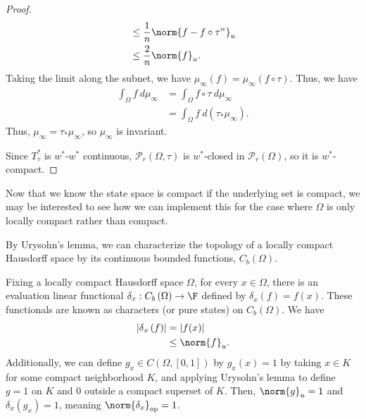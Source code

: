 \documentclass[10pt]{mypackage}
\begin{document}
\begin{proof}
\begin{align*}
                                                                                   &\leq \frac{1}{n}\norm{f - f\circ \tau^{n}}_{u}\\
                                                                                   &\leq \frac{2}{n}\norm{f}_{u}.
  \end{align*}
  Taking the limit along the subnet, we have $\mu_{\infty}\left(f\right) = \mu_{\infty}\left(f\circ \tau\right)$. Thus, we have
  \begin{align*}
    \int_{\Omega}^{} f\:d\mu_{\infty} &= \int_{\Omega}^{} f\circ\tau\:d\mu_{\infty}\\
                                      &= \int_{\Omega}^{} f\:d\left(\tau_{\ast}\mu_{\infty}\right).
  \end{align*}
  Thus, $\mu_{\infty} = \tau_{\ast}\mu_{\infty}$, so $\mu_{\infty}$ is invariant.\newline

  Since $T_{\tau}^{\ast}$ is $w^{\ast}$-$w^{\ast}$ continuous, $\mathcal{P}_{r}\left(\Omega,\tau\right)$ is $w^{\ast}$-closed in $\mathcal{P}_{r}\left(\Omega\right)$, so it is $w^{\ast}$-compact.
\end{proof}
Now that we know the state space is compact if the underlying set is compact, we may be interested to see how we can implement this for the case where $\Omega$ is only locally compact rather than compact.\newline

By Urysohn's lemma, we can characterize the topology of a locally compact Hausdorff space by its continuous bounded functions, $C_{b}\left(\Omega\right)$.\newline

Fixing a locally compact Hausdorff space $\Omega$, for every $x\in \Omega$, there is an evaluation linear functional $\delta_{x}: C_{b}\left(\Omega\right)\rightarrow \F$ defined by $\delta_{x}\left(f\right) = f(x)$. These functionals are known as characters (or pure states) on $C_{b}\left(\Omega\right)$. We have
\begin{align*}
  \left\vert \delta_{x}\left(f\right) \right\vert &= \left\vert f(x) \right\vert\\
                                                  &\leq \norm{f}_{u}.
\end{align*}
Additionally, we can define $g_x\in C\left(\Omega,[0,1]\right)$ by $g_x(x) = 1$ by taking $x\in K$ for some compact neighborhood $K$, and applying Urysohn's lemma to define $g = 1$ on $K$ and $0$ outside a compact superset of $K$. Then, $\norm{g}_{u} = 1$ and $\delta_{x}\left(g_x\right)=  1$, meaning $\norm{\delta_{x}}_{\text{op}} = 1$.\newline
\end{document}
